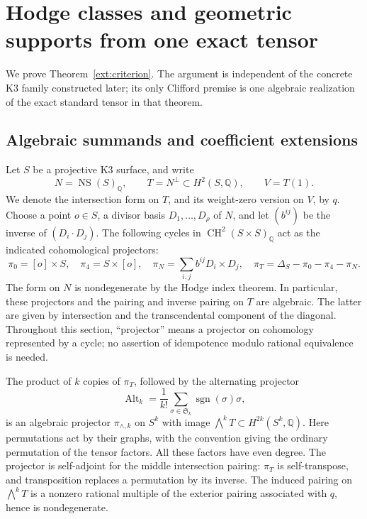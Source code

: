 \documentclass[11pt]{amsart}
\newcommand{\Q}{\mathbb Q}
\DeclareMathOperator{\NS}{NS}
\DeclareMathOperator{\CH}{CH}
\theoremstyle{definition}
\theoremstyle{remark}
\numberwithin{equation}{section}
\begin{document}
\section{Hodge classes and geometric supports from one exact tensor}
\label{ext:section}

We prove Theorem~\ref{ext:criterion}.  The argument is independent of
the concrete K3 family constructed later; its only Clifford premise is
one algebraic realization of the exact standard tensor in that theorem.

\subsection{Algebraic summands and coefficient extensions}

Let $S$ be a projective K3 surface, and write
\[
 N=\NS(S)_{\Q},\qquad T=N^\perp\subset H^2(S,\Q),
 \qquad V=T(1).
\]
We denote the intersection form on $T$, and its weight-zero version
on $V$, by $q$.  Choose a point $o\in S$, a divisor basis
$D_1,\ldots,D_\rho$ of $N$, and let $(b^{ij})$ be the inverse of
$(D_i\cdot D_j)$.  The following cycles in $\CH^2(S\times S)_{\Q}$
act as the indicated cohomological projectors:
\begin{equation}\label{ext:k3-projectors}
 \pi_0=[o]\times S,\quad \pi_4=S\times[o],\quad
 \pi_N=\sum_{i,j}b^{ij}D_i\times D_j,\quad
 \pi_T=\Delta_S-\pi_0-\pi_4-\pi_N.
\end{equation}
The form on $N$ is nondegenerate by the Hodge index theorem.  In
particular, these projectors and the pairing and inverse pairing on
$T$ are algebraic.  The latter are given by intersection and the
transcendental component of the diagonal.  Throughout this section,
``projector'' means a projector on cohomology represented by a cycle;
no assertion of idempotence modulo rational equivalence is needed.

The product of $k$ copies of $\pi_T$, followed by the alternating
projector
\begin{equation}\label{ext:alternator}
 \operatorname{Alt}_k=\frac{1}{k!}
       \sum_{\sigma\in\mathfrak S_k}\operatorname{sgn}(\sigma)\sigma,
\end{equation}
is an algebraic projector $\pi_{\wedge,k}$ on $S^k$ with image
$\bigwedge^k T\subset H^{2k}(S^k,\Q)$.  Here permutations act by
their graphs, with the convention giving the ordinary permutation
of the tensor factors.  All these factors have even degree.
The projector is self-adjoint for the middle intersection pairing:
$\pi_T$ is self-transpose, and transposition replaces a permutation
by its inverse.  The induced pairing on $\bigwedge^kT$ is a nonzero
rational multiple of the exterior pairing associated with $q$,
hence is nondegenerate.
\end{document}
